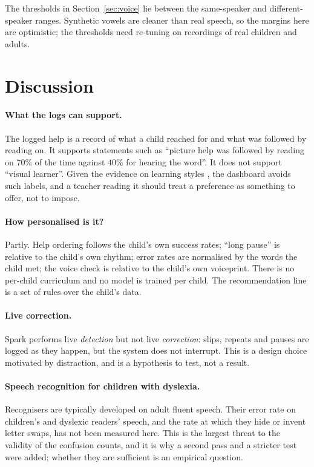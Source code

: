 \documentclass[manuscript, screen, review, anonymous]{acmart}
\begin{document}
The thresholds in Section~\ref{sec:voice} lie between the same-speaker and different-speaker ranges. Synthetic vowels are cleaner than real speech, so the margins here are optimistic; the thresholds need re-tuning on recordings of real children and adults.

\section{Discussion}
\paragraph{What the logs can support.} The logged help is a record of what a child reached for and what was followed by reading on. It supports statements such as ``picture help was followed by reading on 70\% of the time against 40\% for hearing the word''. It does not support ``visual learner''. Given the evidence on learning styles \cite{pashler2008}, the dashboard avoids such labels, and a teacher reading it should treat a preference as something to offer, not to impose.

\paragraph{How personalised is it?} Partly. Help ordering follows the child's own success rates; ``long pause'' is relative to the child's own rhythm; error rates are normalised by the words the child met; the voice check is relative to the child's own voiceprint. There is no per-child curriculum and no model is trained per child. The recommendation line is a set of rules over the child's data.

\paragraph{Live correction.} Spark performs live \emph{detection} but not live \emph{correction}: slips, repeats and pauses are logged as they happen, but the system does not interrupt. This is a design choice motivated by distraction, and is a hypothesis to test, not a result.

\paragraph{Speech recognition for children with dyslexia.} Recognisers are typically developed on adult fluent speech. Their error rate on children's and dyslexic readers' speech, and the rate at which they hide or invent letter swaps, has not been measured here. This is the largest threat to the validity of the confusion counts, and it is why a second pass and a stricter test were added; whether they are sufficient is an empirical question.
\end{document}
